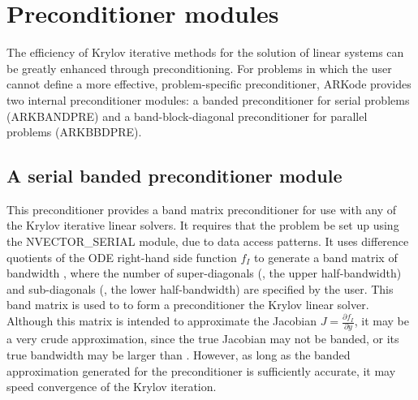 \documentclass[letterpaper,10pt,english]{sphinxmanual}
\begin{document}
\section{Preconditioner modules}
\label{c_interface/Preconditioners::doc}\label{c_interface/Preconditioners:cinterface-preconditionermodules}\label{c_interface/Preconditioners:preconditioner-modules}
The efficiency of Krylov iterative methods for the solution of linear
systems can be greatly enhanced through preconditioning.  For problems
in which the user cannot define a more effective, problem-specific
preconditioner, ARKode provides two internal preconditioner modules:
a banded preconditioner for serial problems (ARKBANDPRE) and a
band-block-diagonal preconditioner  for parallel problems (ARKBBDPRE).


\subsection{A serial banded preconditioner module}
\label{c_interface/Preconditioners:cinterface-bandpre}\label{c_interface/Preconditioners:a-serial-banded-preconditioner-module}
This preconditioner provides a band matrix preconditioner for use with
any of the Krylov iterative linear solvers.  It requires that the
problem be set up using the NVECTOR\_SERIAL module, due to data access
patterns.  It uses difference quotients of the ODE right-hand side
function $f_I$ to generate a band matrix of bandwidth , where the number of super-diagonals (, the upper
half-bandwidth) and sub-diagonals (, the lower half-bandwidth)
are specified by the user.  This band matrix is used to to form a
preconditioner the Krylov linear solver.  Although this matrix is
intended to approximate the Jacobian
$J = \frac{\partial f_I}{\partial y}$, it may be a very crude
approximation, since the true Jacobian may not be banded, or its true
bandwidth may be larger than .  However, as long as the
banded approximation generated for the preconditioner is sufficiently
accurate, it may speed convergence of the Krylov iteration.
\end{document}
